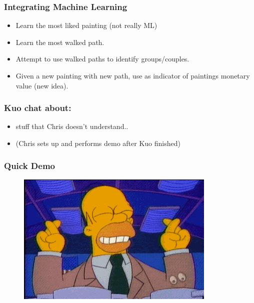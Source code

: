 \documentclass{beamer}
\begin{document}
\begin{frame}\frametitle{Integrating Machine Learning}
\begin{itemize}
\item Learn the most liked painting (not really ML)
\item Learn the most walked path.
\item Attempt to use walked paths to identify groups/couples.
\item Given a new painting with new path, use as indicator of paintings monetary value (new idea).
\end{itemize}
\end{frame}

\begin{frame}\frametitle{Kuo chat about:}
\begin{itemize}
\item stuff that Chris doesn't understand..
\item (Chris sets up and performs demo after Kuo finished)
\end{itemize}
\end{frame}

\begin{frame}\frametitle{Quick Demo}
\begin{figure}
\centering
\includegraphics[scale=2]{homer-crosses-fingers.jpg}
\end{figure}
\end{frame}
\end{document}
